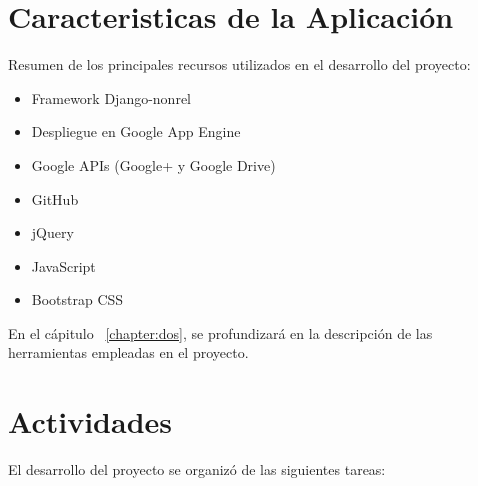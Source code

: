 \section{Caracteristicas de la Aplicación}
\label{1:sec:2}
Resumen de los principales recursos utilizados en el desarrollo del proyecto:
\begin{itemize}
  \item Framework Django-nonrel
  \item Despliegue en Google App Engine
  \item Google APIs (Google+ y Google Drive)
  \item GitHub
  \item jQuery
  \item JavaScript
  \item Bootstrap CSS
  
\end{itemize}
En el cápitulo ~\ref{chapter:dos}, se profundizará en la descripción de las herramientas empleadas en el proyecto.

\section{Actividades}
\label{1:sec:3}
El desarrollo del proyecto se organizó de las siguientes tareas:


